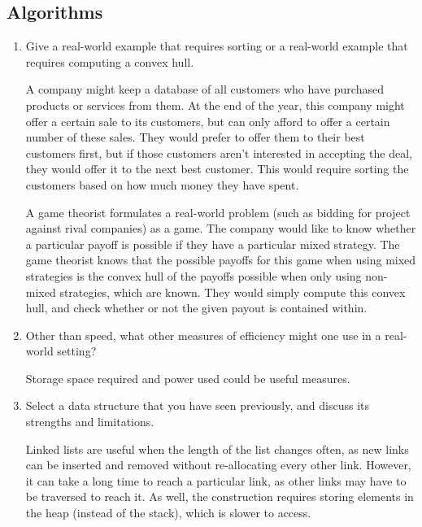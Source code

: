 \documentclass[Chapter01]{subfiles}
\begin{document}
	\subsection{Algorithms}

	\begin{enumerate}
		\item Give a real-world example that requires sorting or a real-world example that requires computing a convex hull.
		\begin{answer}
			A company might keep a database of all customers who have purchased products or services from them. At the end of the year, this company might offer a certain sale to its customers, but can only afford to offer a certain number of these sales. They would prefer to offer them to their best customers first, but if those customers aren't interested in accepting the deal, they would offer it to the next best customer. This would require sorting the customers based on how much money they have spent.
			
			A game theorist formulates a real-world problem (such as bidding for project against rival companies) as a game. The company would like to know whether a particular payoff is possible if they have a particular mixed strategy. The game theorist knows that the possible payoffs for this game when using mixed strategies is the convex hull of the payoffs possible when only using non-mixed strategies, which are known. They would simply compute this convex hull, and check whether or not the given payout is contained within.
		\end{answer}

		\item Other than speed, what other measures of efficiency might one use in a real-world setting?
		\begin{answer}
			Storage space required and power used could be useful measures.
		\end{answer}

		\item Select a data structure that you have seen previously, and discuss its strengths and limitations.
		\begin{answer}
			Linked lists are useful when the length of the list changes often, as new links can be inserted and removed without re-allocating every other link. However, it can take a long time to reach a particular link, as other links may have to be traversed to reach it. As well, the construction requires storing elements in the heap (instead of the stack), which is slower to access.
		\end{answer}


\end{enumerate}
\end{document}
